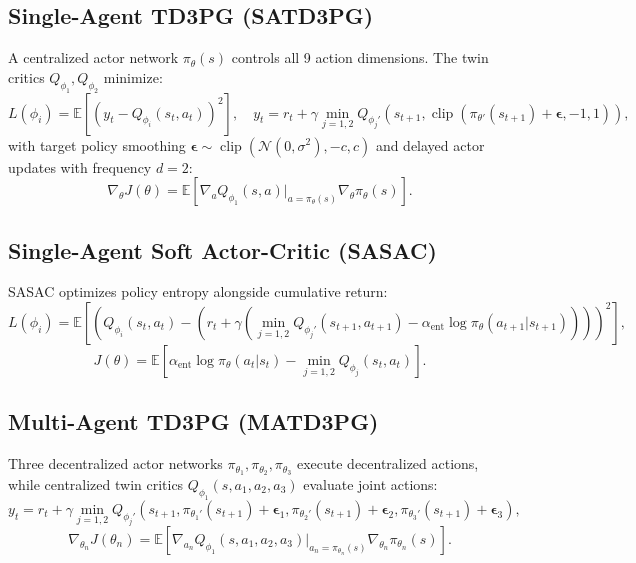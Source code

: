 \documentclass[journal,onecolumn]{IEEEtran}
\begin{document}
\subsection{Single-Agent TD3PG (SATD3PG)}
A centralized actor network $\pi_\theta(s)$ controls all 9 action dimensions. The twin critics $Q_{\phi_1}, Q_{\phi_2}$ minimize:
\begin{equation}
    L(\phi_i) = \mathbb{E}\left[ \left( y_t - Q_{\phi_i}(s_t, a_t) \right)^2 \right], \quad
    y_t = r_t + \gamma \min_{j=1,2} Q_{\phi_j'}\left( s_{t+1}, \operatorname{clip}(\pi_{\theta'}(s_{t+1}) + \bm{\epsilon}, -1, 1) \right),
\end{equation}
with target policy smoothing $\bm{\epsilon} \sim \operatorname{clip}(\mathcal{N}(0, \sigma^2), -c, c)$ and delayed actor updates with frequency $d=2$:
\begin{equation}
    \nabla_\theta J(\theta) = \mathbb{E}\left[ \nabla_a Q_{\phi_1}(s, a)|_{a=\pi_\theta(s)} \nabla_\theta \pi_\theta(s) \right].
\end{equation}

\subsection{Single-Agent Soft Actor-Critic (SASAC)}
SASAC optimizes policy entropy alongside cumulative return:
\begin{equation}
    L(\phi_i) = \mathbb{E}\left[ \left( Q_{\phi_i}(s_t, a_t) - \left( r_t + \gamma \left( \min_{j=1,2} Q_{\phi_j'}(s_{t+1}, a_{t+1}) - \alpha_{\text{ent}} \log \pi_\theta(a_{t+1}|s_{t+1}) \right) \right) \right)^2 \right],
\end{equation}
\begin{equation}
    J(\theta) = \mathbb{E}\left[ \alpha_{\text{ent}} \log \pi_\theta(a_t|s_t) - \min_{j=1,2} Q_{\phi_j}(s_t, a_t) \right].
\end{equation}

\subsection{Multi-Agent TD3PG (MATD3PG)}
Three decentralized actor networks $\pi_{\theta_1}, \pi_{\theta_2}, \pi_{\theta_3}$ execute decentralized actions, while centralized twin critics $Q_{\phi_1}(s, a_1, a_2, a_3)$ evaluate joint actions:
\begin{equation}
    y_t = r_t + \gamma \min_{j=1,2} Q_{\phi_j'}\left( s_{t+1}, \pi_{\theta_1'}(s_{t+1}) + \bm{\epsilon}_1, \pi_{\theta_2'}(s_{t+1}) + \bm{\epsilon}_2, \pi_{\theta_3'}(s_{t+1}) + \bm{\epsilon}_3 \right),
\end{equation}
\begin{equation}
    \nabla_{\theta_n} J(\theta_n) = \mathbb{E}\left[ \nabla_{a_n} Q_{\phi_1}(s, a_1, a_2, a_3)|_{a_n=\pi_{\theta_n}(s)} \nabla_{\theta_n} \pi_{\theta_n}(s) \right].
\end{equation}
\end{document}
